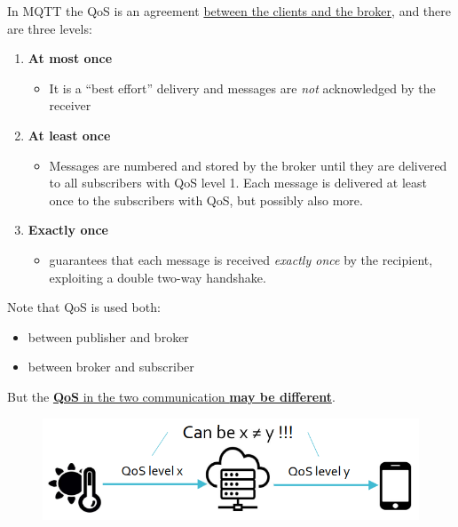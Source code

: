 In MQTT the QoS is an agreement \ul{between the clients and the broker}, and there are three levels:
\begin{enumerate}[label={\texttt{level \arabic*}},start=0]
   \item \textbf{At most once}
   \begin{itemize}
      \item It is a ``best effort'' delivery and messages are \textit{not} acknowledged by the receiver
   \end{itemize}
   \item \textbf{At least once}
   \begin{itemize}
      \item Messages are numbered and stored by the broker until
      they are delivered to all subscribers with QoS level 1. Each message is delivered at least once to the subscribers with QoS, but possibly also more. 
   \end{itemize}
   \item \textbf{Exactly once}
   \begin{itemize}
      \item  guarantees that each message is received \textit{exactly once} by the recipient, exploiting a double two-way handshake.
   \end{itemize}
\end{enumerate}

{Note that QoS is used both:
\ns
\begin{itemize}
   \item between publisher and broker
   \item between broker and subscriber
\end{itemize}
But the \ul{\textbf{QoS} in the two communication \textbf{may be different}}.
}
\begin{figure}[htbp]
   \centering
   \includegraphics{images/qos_different.png}
   \label{fig:qos_different}
\end{figure}

